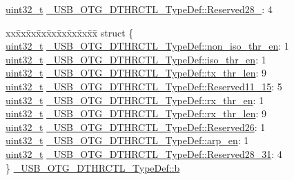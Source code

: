\begin{DoxyCompactItemize}
\item 
\hyperlink{stdint_8h_a435d1572bf3f880d55459d9805097f62}{uint32\-\_\-t} \hyperlink{group___u_s_b___o_t_g___d_r_i_v_e_r_ga11a3281d786b50e552ccfc47d7de12b5}{\-\_\-\-U\-S\-B\-\_\-\-O\-T\-G\-\_\-\-D\-T\-H\-R\-C\-T\-L\-\_\-\-Type\-Def\-::\-Reserved28\-\_}\-: 4
\item 
\begin{tabbing}
xx\=xx\=xx\=xx\=xx\=xx\=xx\=xx\=xx\=\kill
struct \{\\
\>\hyperlink{stdint_8h_a435d1572bf3f880d55459d9805097f62}{uint32\_t} \hyperlink{group___u_s_b___o_t_g___d_r_i_v_e_r_ga437a4ecc78a29535cb600a64f99fdded}{\_USB\_OTG\_DTHRCTL\_TypeDef::non\_iso\_thr\_en}: 1\\
\>\hyperlink{stdint_8h_a435d1572bf3f880d55459d9805097f62}{uint32\_t} \hyperlink{group___u_s_b___o_t_g___d_r_i_v_e_r_ga061c382bbfc6cb270dd9074511b6546b}{\_USB\_OTG\_DTHRCTL\_TypeDef::iso\_thr\_en}: 1\\
\>\hyperlink{stdint_8h_a435d1572bf3f880d55459d9805097f62}{uint32\_t} \hyperlink{group___u_s_b___o_t_g___d_r_i_v_e_r_ga567c6393ecd2b93a7bb261d16f56543a}{\_USB\_OTG\_DTHRCTL\_TypeDef::tx\_thr\_len}: 9\\
\>\hyperlink{stdint_8h_a435d1572bf3f880d55459d9805097f62}{uint32\_t} \hyperlink{group___u_s_b___o_t_g___d_r_i_v_e_r_gaf4fce312a08ead77b5fe741fcff35b5d}{\_USB\_OTG\_DTHRCTL\_TypeDef::Reserved11\_15}: 5\\
\>\hyperlink{stdint_8h_a435d1572bf3f880d55459d9805097f62}{uint32\_t} \hyperlink{group___u_s_b___o_t_g___d_r_i_v_e_r_gabf30ccd0997e6301c6783cd50a71e599}{\_USB\_OTG\_DTHRCTL\_TypeDef::rx\_thr\_en}: 1\\
\>\hyperlink{stdint_8h_a435d1572bf3f880d55459d9805097f62}{uint32\_t} \hyperlink{group___u_s_b___o_t_g___d_r_i_v_e_r_ga17bd381e2313feab5337735207e2a93a}{\_USB\_OTG\_DTHRCTL\_TypeDef::rx\_thr\_len}: 9\\
\>\hyperlink{stdint_8h_a435d1572bf3f880d55459d9805097f62}{uint32\_t} \hyperlink{group___u_s_b___o_t_g___d_r_i_v_e_r_ga632ec9c8d1277a82227409d456d3f545}{\_USB\_OTG\_DTHRCTL\_TypeDef::Reserved26}: 1\\
\>\hyperlink{stdint_8h_a435d1572bf3f880d55459d9805097f62}{uint32\_t} \hyperlink{group___u_s_b___o_t_g___d_r_i_v_e_r_gabb5b2edd6a3c01d382137065e1277feb}{\_USB\_OTG\_DTHRCTL\_TypeDef::arp\_en}: 1\\
\>\hyperlink{stdint_8h_a435d1572bf3f880d55459d9805097f62}{uint32\_t} \hyperlink{group___u_s_b___o_t_g___d_r_i_v_e_r_ga11a3281d786b50e552ccfc47d7de12b5}{\_USB\_OTG\_DTHRCTL\_TypeDef::Reserved28\_31}: 4\\
\} \hyperlink{group___u_s_b___o_t_g___d_r_i_v_e_r_ga47a9e165b9c7e488abd30978d4a8e0cb}{\_USB\_OTG\_DTHRCTL\_TypeDef::b}\\


\end{tabbing}
\end{DoxyCompactItemize}
